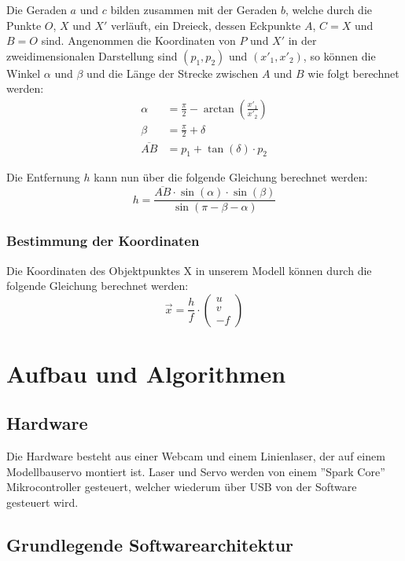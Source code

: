 \documentclass[ngerman,a4paper,parskip=half]{scrartcl}
\begin{document}
Die Geraden $a$ und $c$ bilden zusammen mit der Geraden $b$, welche durch die Punkte $O$, $X$ und $X'$ verläuft, ein Dreieck, dessen Eckpunkte $A$, $C = X$ und $B = O$ sind. Angenommen die Koordinaten von $P$ und $X'$ in der zweidimensionalen Darstellung sind $(p_1,p_2)$ und $(x'_1, x'_2)$, so können die Winkel $\alpha$ und $\beta$ und die Länge der Strecke zwischen $A$ und $B$ wie folgt berechnet werden:
\begin{align*}
	\alpha &= \frac{\pi}{2} - \arctan\left(\frac{x'_1}{x'_2}\right)\\
	\beta &= \frac{\pi}{2} + \delta\\
	\overline{AB} &= p_1 + \tan(\delta) \cdot p_2
\end{align*}

Die Entfernung $h$ kann nun über die folgende Gleichung berechnet werden:
\[ h = \frac{\overline{AB} \cdot \sin(\alpha) \cdot \sin(\beta)}{\sin(\pi - \beta - \alpha)} \]

\subsubsection{Bestimmung der Koordinaten}

Die Koordinaten des Objektpunktes X in unserem Modell können durch die folgende Gleichung berechnet werden:
\[ \vec{x} = \frac{h}{f} \cdot \begin{pmatrix}
u \\ v \\ -f
\end{pmatrix} \]


\section{Aufbau und Algorithmen}

\subsection{Hardware}

Die Hardware besteht aus einer Webcam und einem Linienlaser, der auf einem Modellbauservo montiert ist. Laser und Servo werden von einem ''Spark Core'' Mikrocontroller gesteuert, welcher wiederum über USB von der Software gesteuert wird.

\subsection{Grundlegende Softwarearchitektur}
\end{document}

